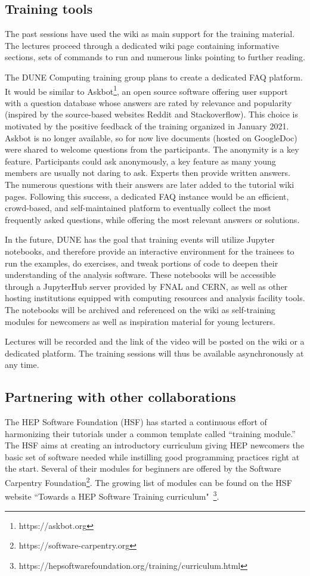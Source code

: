 \documentclass[../main-v1.tex]{subfiles}
\begin{document}
\subsection{Training tools}
The past sessions have used the wiki as main support for the training material. The lectures proceed through a dedicated wiki page containing informative sections, sets of commands to run and numerous links pointing to further reading.

The DUNE Computing training group plans to create a dedicated FAQ platform. It would be similar to  Askbot\footnote{https://askbot.org}, an open source software offering user support with a question database whose answers are rated by relevance and popularity (inspired by the source-based websites Reddit and Stackoverflow). This choice is motivated by the positive feedback of the training organized in January 2021. Askbot is no longer available, so for now live documents (hosted on GoogleDoc) were shared to welcome questions from the participants. The anonymity is a key feature. Participants could ask anonymously, a key feature as many young members are usually not daring to ask. Experts then provide written answers. The numerous questions with their answers are later added to the tutorial wiki pages. Following this success, a dedicated FAQ instance would be an efficient, crowd-based, and self-maintained platform to eventually collect the most frequently asked questions, while offering the most relevant answers or solutions.

In the future, DUNE has the goal that training events will utilize Jupyter notebooks, and therefore provide an interactive environment for the trainees to run the examples, do exercises, and tweak portions of code to deepen their understanding of the analysis software. These notebooks will be accessible through a JupyterHub server provided by FNAL and CERN, as well as other hosting institutions equipped with computing resources and analysis facility tools. The notebooks will be archived and referenced on the wiki as self-training modules for newcomers as well as inspiration material for young lecturers.

Lectures will be recorded and the link of the video will be posted on the wiki or a dedicated platform. The training sessions will thus be available asynchronously at any time.

\subsection{Partnering with other collaborations}
The HEP Software Foundation (HSF) has started a continuous effort of harmonizing their tutorials under a common template called “training module.” The HSF aims at creating an introductory curriculum giving HEP newcomers the basic set of software needed while instilling good programming practices right at the start. Several of their modules for beginners are offered by the Software Carpentry Foundation\footnote{https://software-carpentry.org }. The growing list of modules can be found on the HSF website “Towards a HEP Software Training curriculum"~\footnote{https://hepsoftwarefoundation.org/training/curriculum.html}.
\end{document}
